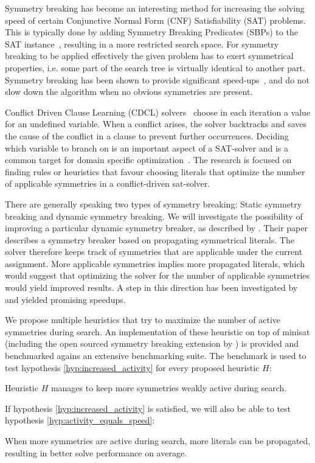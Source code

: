 Symmetry breaking has become an interesting method for increasing the solving speed of
certain Conjunctive Normal Form (CNF) Satisfiability (SAT) problems.
This is typically done by adding Symmetry Breaking Predicates (SBPs) to the SAT
instance~\cite{sakallah2009symmetry}, resulting in a more restricted search space.
For symmetry breaking to be applied effectively the given problem has to exert symmetrical
properties, i.e. some part of the search tree is virtually identical to another part.
Symmetry breaking has been shown to provide significant
speed-ups~\cite{darga2004exploiting,aloul2003solving}, and do not slow down the algorithm
when no obvious symmetries are present.

Conflict Driven Clause Learning (CDCL) solvers~\cite{marques1999grasp} choose in each iteration a value for an undefined variable.
When a conflict arises, the solver backtracks
and saves the cause of the conflict in a clause to prevent further occurrences.
Deciding which variable to branch on is an important aspect of a SAT-solver and is a common target
for domain specific optimization~\cite{een2004extensible}.
The research is focused on finding rules or heuristics that favour choosing literals
that optimize the number of applicable symmetries in a conflict-driven sat-solver.

There are generally speaking two types of symmetry breaking: Static symmetry breaking and
dynamic symmetry breaking.
We will investigate the possibility of improving a particular dynamic symmetry breaker, as described
by \cite{devriendt2012symmetry}.
Their paper describes a symmetry breaker based on propagating symmetrical literals.
The solver therefore keeps track of symmetries that are applicable under the current assignment.
More applicable symmetries implies more propagated literals, which would suggest that
optimizing the solver for the number of applicable symmetries would yield improved results.
A step in this direction has been investigated by \cite{devriendt2012symmetry} and yielded
promising speedups.

We propose multiple heuristics that try to maximize the number of active symmetries during
search.
An implementation of these heuristic on top of minisat (including the open sourced symmetry breaking
extension by \cite{devriendt2012symmetry}) is provided and benchmarked agains an extensive
benchmarking suite.
The benchmark is used to test hypothesis \ref{hyp:increased_activity} for every proposed heuristic
$H$: \\

\begin{hypothesis}
\label{hyp:increased_activity}
	Heuristic $H$ manages to keep more symmetries weakly active during search.
\end{hypothesis}

If hypothesis \ref{hyp:increased_activity} is satisfied, we will also be able to test
hypothesis \ref{hyp:activity_equals_speed}: \\

\begin{hypothesis}
\label{hyp:activity_equals_speed}
	When more symmetries are active during search, more literals can be propagated, resulting in
	better solve performance on average.
\end{hypothesis}
